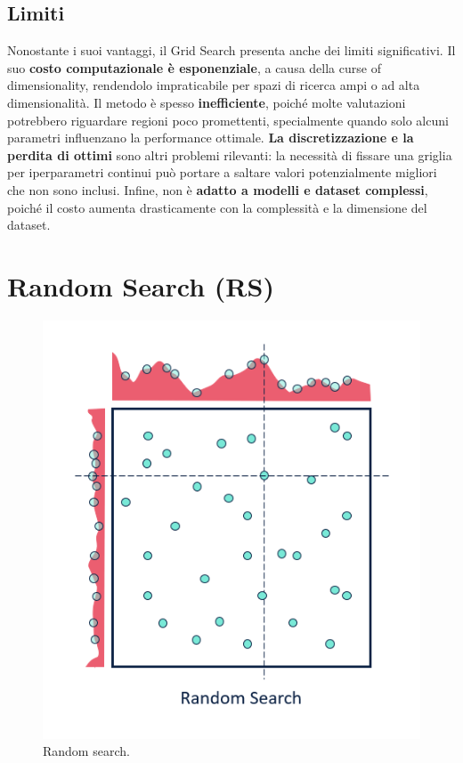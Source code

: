 \documentclass[a4paper,12pt]{report}
\begin{document}
	\subsection{Limiti}
	Nonostante i suoi vantaggi, il Grid Search presenta anche dei limiti significativi. Il suo \textbf{costo computazionale è esponenziale}, a causa della curse of dimensionality, rendendolo impraticabile per spazi di ricerca ampi o ad alta dimensionalità. Il metodo è spesso \textbf{inefficiente}, poiché molte valutazioni potrebbero riguardare regioni poco promettenti, specialmente quando solo alcuni parametri influenzano la performance ottimale. \textbf{La discretizzazione e la perdita di ottimi} sono altri problemi rilevanti: la necessità di fissare una griglia per iperparametri continui può portare a saltare valori potenzialmente migliori che non sono inclusi. Infine, non è \textbf{adatto a modelli e dataset complessi}, poiché il costo aumenta drasticamente con la complessità e la dimensione del dataset.
	
	\section{Random Search (RS)}
	\begin{figure}[H]
		\centering
		\includegraphics[width=1.0\textwidth]{img/rs.png}
		\caption{Random search.}
	\end{figure}
\end{document}
